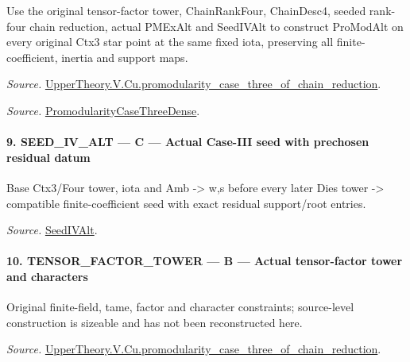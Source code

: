 Use the original tensor-factor tower, ChainRankFour, ChainDesc4, seeded rank-four chain reduction, actual PMExAlt and SeedIVAlt to construct ProModAlt on every original Ctx3 star point at the same fixed iota, preserving all finite-coefficient, inertia and support maps.

\emph{Source.} \href{https://github.com/CocoSgt/riemann-hypothesis-lean/blob/7cbf7a0c32fca1badf05931879a37c3f8a2b03b4/src/Development/AutomorphicArithmetic/AutomorphicVarieties/ModularityArgument/ThresholdArguments/DenseThresholdCases/PromodularityCaseThreeOfLemmas.lean#L131-L153}{UpperTheory.V.Cu.promodularity\_\allowbreak case\_\allowbreak three\_\allowbreak of\_\allowbreak chain\_\allowbreak reduction}.

\emph{Source.} \href{https://github.com/CocoSgt/riemann-hypothesis-lean/blob/7cbf7a0c32fca1badf05931879a37c3f8a2b03b4/src/Development/AutomorphicArithmetic/AutomorphicVarieties/ModularityArgument/ThresholdArguments/DenseThresholdCases/PromodularityCaseThree.lean#L40-L42}{PromodularityCaseThreeDense}.



\paragraph{9. SEED\_\allowbreak IV\_\allowbreak ALT — C — Actual Case-III seed with prechosen residual datum}

Base Ctx3/Four tower, iota and Amb -> w,s before every later Dies tower -> compatible finite-coefficient seed with exact residual support/root entries.

\emph{Source.} \href{https://github.com/CocoSgt/riemann-hypothesis-lean/blob/7cbf7a0c32fca1badf05931879a37c3f8a2b03b4/src/Development/AutomorphicArithmetic/AutomorphicVarieties/ModularityArgument/ThresholdArguments/DenseThresholdCases/PromodularityCaseThree.lean#L19-L25}{SeedIVAlt}.



\paragraph{10. TENSOR\_\allowbreak FACTOR\_\allowbreak TOWER — B — Actual tensor-factor tower and characters}

Original finite-field, tame, factor and character constraints; source-level construction is sizeable and has not been reconstructed here.

\emph{Source.} \href{https://github.com/CocoSgt/riemann-hypothesis-lean/blob/7cbf7a0c32fca1badf05931879a37c3f8a2b03b4/src/Development/AutomorphicArithmetic/AutomorphicVarieties/ModularityArgument/ThresholdArguments/DenseThresholdCases/PromodularityCaseThreeOfLemmas.lean#L131-L153}{UpperTheory.V.Cu.promodularity\_\allowbreak case\_\allowbreak three\_\allowbreak of\_\allowbreak chain\_\allowbreak reduction}.



